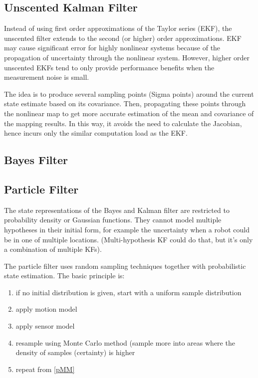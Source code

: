 \begin{multicols*}{2}
\subsection{Unscented Kalman Filter}
Instead of using first order approximations of the Taylor series (EKF), the unscented filter extends to the second (or higher) order approximations. EKF may cause significant error for highly nonlinear systems because of the propagation of uncertainty through the nonlinear system. However, higher order unscented EKFs tend to only provide performance benefits when the measurement noise is small.

The idea is to produce several sampling points (Sigma points) around the current state estimate based on its covariance. Then, propagating these points through the nonlinear map to get more accurate estimation of the mean and covariance of the mapping results. In this way, it avoids the need to calculate the Jacobian, hence incurs only the similar computation load as the EKF.

\subsection{Bayes Filter}


\subsection{Particle Filter}
The state representations of the Bayes and Kalman filter are restricted to probability density or Gaussian functions. They cannot model multiple hypotheses in their initial form, for example the uncertainty when a robot could be in one of multiple locations. (Multi-hypothesis KF could do that, but it's only a combination of multiple KFs).

The particle filter uses random sampling techniques together with probabilistic state estimation. The basic principle is:
\begin{enumerate}
	\item if no initial distribution is given, start with a uniform sample distribution
	\item apply motion model \label{pMM}
	\item apply sensor model
	\item resample using Monte Carlo method (sample more into areas where the density of samples (certainty) is higher
	\item repeat from \ref{pMM}
\end{enumerate}



\end{multicols*}

